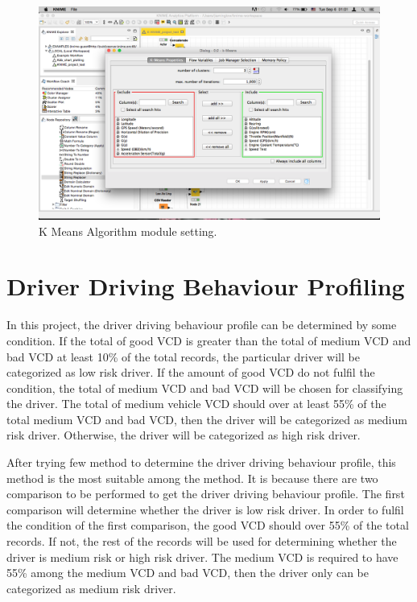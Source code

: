 \begin{figure}[hbt!]\centering
\includegraphics[width=.75\textwidth]{image/KNIMEkmean}
\caption{K Means Algorithm module setting.}
\label{fig:kmean}
\end{figure}



\section{Driver Driving Behaviour Profiling}
In this project, the driver driving behaviour profile can be determined by some condition. %
If the total of good VCD is greater than the total of medium VCD and bad VCD at least 10\% of the total records, the particular driver will be categorized as low risk driver. If the amount of good VCD do not fulfil the condition, the total of medium VCD and bad VCD will be chosen for classifying the driver. The total of medium vehicle VCD should over at least 55\% of the total medium VCD and bad VCD, then the driver will be categorized as medium risk driver. Otherwise, the driver will be categorized as high risk driver.

After trying few method to determine the driver driving behaviour profile, this method is the most suitable among the method. It is because there are two comparison to be performed to get the driver driving behaviour profile. The first comparison will determine whether the driver is low risk driver. In order to fulfil the condition of the first comparison, the good VCD should over 55\% of the total records. If not, the rest of the records will be used for determining whether the driver is medium risk or high risk driver. The medium VCD is required to have 55\% among the medium VCD and bad VCD, then the driver only can be categorized as medium risk driver.

